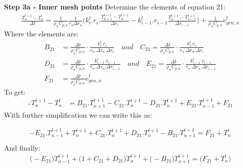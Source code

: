 \documentclass[11pt,letterpaper,titlepage]{article}
\begin{document}
\vspace{0.5cm}\noindent
\textbf{Step 3a - Inner mesh points}\newline
Determine the elements of equation 21:
\begin{equation*}
\begin{aligned}
\frac{T_n^{t+1}-T_n^t}{\Delta t} = \frac{1}{\rho_n C_{p,n}} \frac{1}{r_n\Delta r_n} \biggr(  k_i^t.r_i. \frac{T_{n+1}^{t+1} - T_{n}^{t+1}}{\Delta r_i}  - k_{i-1}^t.r_{i-1} \frac{T_{n}^{t+1} - T_{n-1}^{t+1}}{\Delta r_{i-1}} \biggr) + \frac{1}{\rho_n C_{p,n}} \dot{e}_{gen,n}^t
\end{aligned}
\end{equation*}
\newline
Where the elements are:
\begin{equation*}
\begin{aligned}
B_{21}&=\frac{\Delta t}{\rho_n C_{p,n}} \cdot \frac{k_i^t.r_i        }{r_n.\Delta r_n.\Delta r_i}
 \quad and \quad
C_{21} =\frac{\Delta t}{\rho_n C_{p,n}} \cdot \frac{k_i^t.r_i        }{r_n.\Delta r_n.\Delta r_i} \\
D_{21}&=\frac{\Delta t}{\rho_n C_{p,n}} \cdot \frac{k_{i-1}^t.r_{i-1}}{r_n.\Delta r_n.\Delta r_{i-1}}
 \quad and \quad
E_{21}=\frac{\Delta t}{\rho_n C_{p,n}} \cdot \frac{k_{i-1}^t.r_{i-1}}{r_n.\Delta r_n.\Delta r_{i-1}}\\ 
F_{21}&=\frac{\Delta t}{\rho_n C_{p,n}} \dot{e}_{gen,n}^t
\end{aligned}
\end{equation*}
\newline
To get:
\begin{equation*}
\begin{aligned}
\therefore T_n^{t+1}-T_n^t&= B_{21}.T_{n+1}^{t+1} - C_{21}.T_{n}^{t+1}    
			    - D_{21}.T_{n}^{t+1} + E_{21}.T_{n-1}^{t+1}   
			    + F_{21}        
\end{aligned}
\end{equation*}
With further simplification we can write this as:

\begin{equation*}
\begin{aligned}
-E_{21}.T_{n-1}^{t+1} 
+ T_n^{t+1} + C_{21}.T_{n}^{t+1} + D_{21}.T_{n}^{t+1}
-B_{21}.T_{n+1}^{t+1}
=F_{21} + T_n^t \\
\end{aligned}
\end{equation*}
\newline
And finally:
\begin{equation}
\begin{aligned}
\biggr( -E_{21} \biggr)T_{n-1}^{t+1}
+ \biggr(1 + C_{21} + D_{21} \biggr) T_{n}^{t+1}
+ \biggr( -B_{21} \biggr)T_{n+1}^{t+1}
=\biggr( F_{21} + T_n^t \biggr) \\
\end{aligned}
\end{equation}
\end{document}
